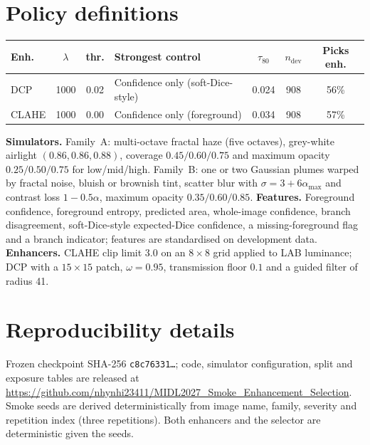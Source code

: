 \documentclass{midl}
\begin{document}
\section{Policy definitions}
\begin{table}[htbp]
{\scriptsize\begin{tabular}{lcclccc}\toprule Enh. & $\lambda$ & thr. & Strongest control & $\tau_{80}$ & $n_{\mathrm{dev}}$ & Picks enh.\\\midrule
DCP & 1000 & 0.02 & Confidence only (soft-Dice-style) & 0.024 & 908 & 56\% \\
CLAHE & 1000 & 0.00 & Confidence only (foreground) & 0.034 & 908 & 57\% \\
\bottomrule\end{tabular}}
\end{table}
\textbf{Simulators.} Family~A: multi-octave fractal haze (five octaves), grey-white airlight $(0.86,0.86,0.88)$, coverage $0.45/0.60/0.75$ and maximum opacity $0.25/0.50/0.75$ for low/mid/high. Family~B: one or two Gaussian plumes warped by fractal noise, bluish or brownish tint, scatter blur with $\sigma=3+6\alpha_{\max}$ and contrast loss $1-0.5\alpha$, maximum opacity $0.35/0.60/0.85$. \textbf{Features.} Foreground confidence, foreground entropy, predicted area, whole-image confidence, branch disagreement, soft-Dice-style expected-Dice confidence, a missing-foreground flag and a branch indicator; features are standardised on development data. \textbf{Enhancers.} CLAHE clip limit 3.0 on an $8{\times}8$ grid applied to LAB luminance; DCP with a $15{\times}15$ patch, $\omega=0.95$, transmission floor $0.1$ and a guided filter of radius 41.

\section{Reproducibility details}
Frozen checkpoint SHA-256 \texttt{c8c76331\ldots}; code, simulator configuration, split and exposure tables are released at \url{https://github.com/nhynhi23411/MIDL2027_Smoke_Enhancement_Selection}. Smoke seeds are derived deterministically from image name, family, severity and repetition index (three repetitions). Both enhancers and the selector are deterministic given the seeds.
\end{document}
